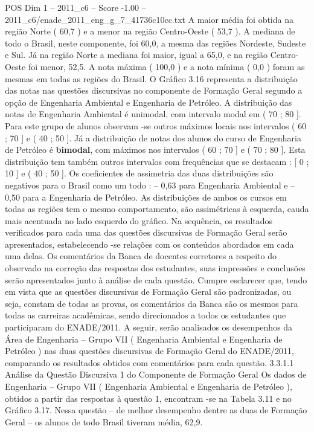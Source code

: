 \begin{textsample}{POS Dim 1 – 2011\_c6 – Score -1.00 – 2011\_c6/enade\_2011\_eng\_g\_7\_41736c10cc.txt}
A maior média foi obtida na região Norte ( 60,7 ) e a menor na região Centro-Oeste ( 53,7 ).
A mediana de todo o Brasil, neste componente, foi 60,0, a mesma das regiões Nordeste, Sudeste e Sul.
Já na região Norte a mediana foi maior, igual a 65,0, e na região Centro-Oeste foi menor, 52,5.
A nota máxima ( 100,0 ) e a nota mínima ( 0,0 ) foram as mesmas em todas as regiões do Brasil.
O Gráfico 3.16 representa a distribuição das notas nas questões discursivas no componente de Formação Geral segundo a opção de Engenharia Ambiental e Engenharia de Petróleo.
A distribuição das notas de Engenharia Ambiental é unimodal, com intervalo modal em ( 70 ; 80 ].
Para este grupo de alunos observam -se outros máximos locais nos intervalos ( 60 ; 70 ] e ( 40 ; 50 ].
Já a distribuição de notas dos alunos do curso de Engenharia de Petróleo é \textbf{bimodal}, com máximos nos intervalos ( 60 ; 70 ] e ( 70 ; 80 ].
Esta distribuição tem também outros intervalos com frequências que se destacam : [ 0 ; 10 ] e ( 40 ; 50 ].
Os coeficientes de assimetria das duas distribuições são negativos para o Brasil como um todo : – 0,63 para Engenharia Ambiental e – 0,50 para a Engenharia de Petróleo.
As distribuições de ambos os cursos em todas as regiões tem o mesmo comportamento, são assimétricas à esquerda, cauda mais acentuada no lado esquerdo do gráfico.
Na sequência, os resultados verificados para cada uma das questões discursivas de Formação Geral serão apresentados, estabelecendo -se relações com os conteúdos abordados em cada uma delas.
Os comentários da Banca de docentes corretores a respeito do observado na correção das respostas dos estudantes, suas impressões e conclusões serão apresentados junto à análise de cada questão.
Cumpre esclarecer que, tendo em vista que as questões discursivas de Formação Geral são padronizadas, ou seja, constam de todas as provas, os comentários da Banca são os mesmos para todas as carreiras acadêmicas, sendo direcionados a todos os estudantes que participaram do ENADE/2011.
A seguir, serão analisados os desempenhos da Área de Engenharia – Grupo VII ( Engenharia Ambiental e Engenharia de Petróleo ) nas duas questões discursivas de Formação Geral do ENADE/2011, comparando os resultados obtidos com comentários para cada questão. 3.3.1.1 Análise da Questão Discursiva 1 do Componente de Formação Geral Os dados de Engenharia – Grupo VII ( Engenharia Ambiental e Engenharia de Petróleo ), obtidos a partir das respostas à questão 1, encontram -se na Tabela 3.11 e no Gráfico 3.17.
Nessa questão – de melhor desempenho dentre as duas de Formação Geral – os alunos de todo Brasil tiveram média, 62,9.

\end{textsample}
